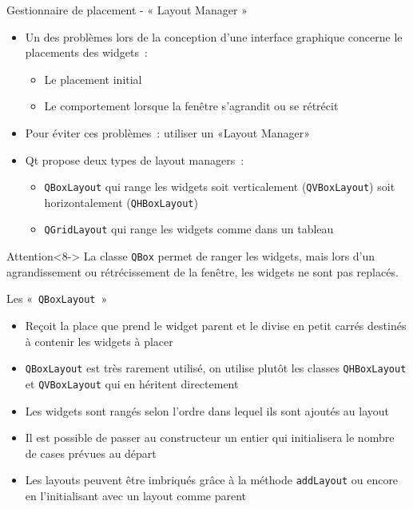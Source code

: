 \documentclass{beamer} %
\begin{document}
\begin{frame}{Gestionnaire de placement - « Layout Manager »}
	\begin{itemize}
	\item Un des problèmes lors de la conception d'une interface graphique concerne le placements des widgets~:
		\begin{itemize}
		\item<2-> Le placement initial
		\item<3-> Le comportement lorsque la fenêtre s'agrandit ou se rétrécit
		\end{itemize}
	\item<4-> Pour éviter ces problèmes~: utiliser un «Layout Manager»
	\item<5-> Qt propose deux types de layout managers~:
		\begin{itemize}
		\item<6-> \texttt{QBoxLayout} qui range les widgets soit verticalement (\texttt{QVBoxLayout}) soit horizontalement (\texttt{QHBoxLayout})
		\item<7-> \texttt{QGridLayout} qui range les widgets comme dans un tableau
		\end{itemize}
	\end{itemize}
	\begin{alertblock}{Attention}<8->
	La classe \texttt{QBox} permet de ranger les widgets, mais lors d'un agrandissement ou rétrécissement de la fenêtre, les widgets ne sont pas replacés.
	\end{alertblock}
\end{frame}

\begin{frame}{Les «~\texttt{QBoxLayout}~» }
	\begin{itemize}
	\item Reçoit la place que prend le widget parent et le divise en petit carrés destinés à contenir les widgets à placer
	\item<2-> \texttt{QBoxLayout} est très rarement utilisé, on utilise plutôt les classes \texttt{QHBoxLayout} et \texttt{QVBoxLayout} qui en héritent directement
	\item<3-> Les widgets sont rangés selon l'ordre dans lequel ils sont ajoutés au layout
	\item<4-> Il est possible de passer au constructeur un entier qui initialisera le nombre de cases prévues au départ
	\item<5-> Les layouts peuvent être imbriqués grâce à la méthode \texttt{addLayout} ou encore en l'initialisant avec un layout comme parent
	\end{itemize}
\end{frame}
\end{document}

